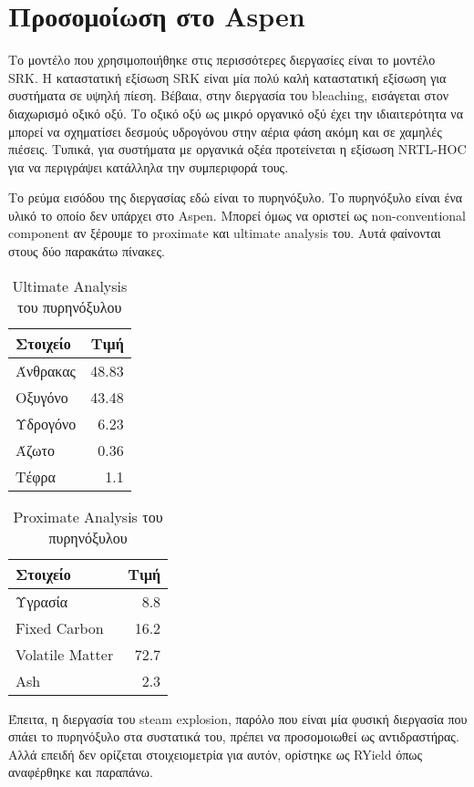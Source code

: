 \documentclass[11pt]{article}
\begin{document}
\section{Προσομοίωση στο Aspen}
\label{sec:org28466a8}
Το μοντέλο που χρησιμοποιήθηκε στις περισσότερες διεργασίες είναι το μοντέλο SRK. Η καταστατική εξίσωση SRK είναι μία πολύ καλή καταστατική εξίσωση για συστήματα σε υψηλή πίεση. Βέβαια, στην διεργασία του bleaching, εισάγεται στον διαχωρισμό οξικό οξύ. Το οξικό οξύ ως μικρό οργανικό οξύ έχει την ιδιαιτερότητα να μπορεί να σχηματίσει δεσμούς υδρογόνου στην αέρια φάση ακόμη και σε χαμηλές πιέσεις. Τυπικά, για συστήματα με οργανικά οξέα προτείνεται η εξίσωση NRTL-HOC για να περιγράψει κατάλληλα την συμπεριφορά τους.

Το ρεύμα εισόδου της διεργασίας εδώ είναι το πυρηνόξυλο. Το πυρηνόξυλο είναι ένα υλικό το οποίο δεν υπάρχει στο Aspen. Μπορεί όμως να οριστεί ως non-conventional component αν ξέρουμε το proximate και ultimate analysis του. Αυτά φαίνονται στους δύο παρακάτω πίνακες.

\begin{table}[htbp]
\caption{Ultimate Analysis του πυρηνόξυλου}
\centering
\begin{tabular}{lr}
Στοιχείο & Τιμή\\
\hline
Άνθρακας & 48.83\\
Οξυγόνο & 43.48\\
Υδρογόνο & 6.23\\
Άζωτο & 0.36\\
Τέφρα & 1.1\\
\end{tabular}
\end{table}

\begin{table}[htbp]
\caption{Proximate Analysis του πυρηνόξυλου}
\centering
\begin{tabular}{lr}
Στοιχείο & Τιμή\\
\hline
Υγρασία & 8.8\\
Fixed Carbon & 16.2\\
Volatile Matter & 72.7\\
Ash & 2.3\\
\end{tabular}
\end{table}

Έπειτα, η διεργασία του steam explosion, παρόλο που είναι μία φυσική διεργασία που σπάει το πυρηνόξυλο στα συστατικά του, πρέπει να προσομοιωθεί ως αντιδραστήρας. Αλλά επειδή δεν ορίζεται στοιχειομετρία για αυτόν, ορίστηκε ως RYield όπως αναφέρθηκε και παραπάνω.
\end{document}
